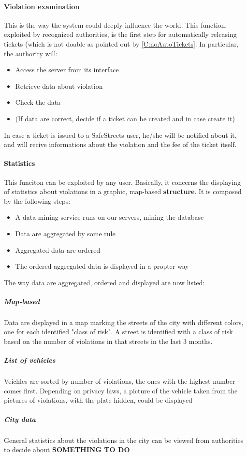 \documentclass{article}
\begin{document}
		\paragraph{Violation examination}
			This is the way the system could deeply influence the world. This function, exploited by recognized authorities, is the first step for automatically releasing tickets (which is not doable as pointed out by \ref{C:noAutoTickets}. In particular, the authority will:
			\begin{itemize}
				\item Access the server from its interface
				\item Retrieve data about violation
				\item Check the data
				\item (If data are correct, decide if a ticket can be created and in case create it)
			\end{itemize}
			In case a ticket is issued to a SafeStreets user, he/she will be notified about it, and will recive informations about the violation and the fee of the ticket itself.
		
		\paragraph{Statistics}
			This funciton can be exploited by any user. Basically, it concerns the displaying of statistics about violations in a graphic, map-based \textbf{structure}. It is composed by the following steps:
			\begin{itemize}
				\item A data-mining service runs on our servers, mining the database
				\item Data are aggregated by some rule
				\item Aggregated data are ordered
				\item The ordered aggregated data is displayed in a propter way
			\end{itemize}
			The way data are aggregated, ordered and displayed are now listed:
				\subparagraph{Map-based} Data are displayed in a map marking the streets of the city with different colors, one for each identified "class of risk". A street is identified with a class of risk based on the number of violations in that streets in the last 3 months.
				\subparagraph{List of vehicles} Veichles are sorted by number of violations, the ones with the highest number comes first. Depending on privacy laws, a picture of the vehicle taken from the pictures of violations, with the plate hidden, could be displayed
				\subparagraph{City data} General statistics about the violations in the city can be viewed from authorities to decide about \textbf{SOMETHING TO DO}
				
\end{document}
